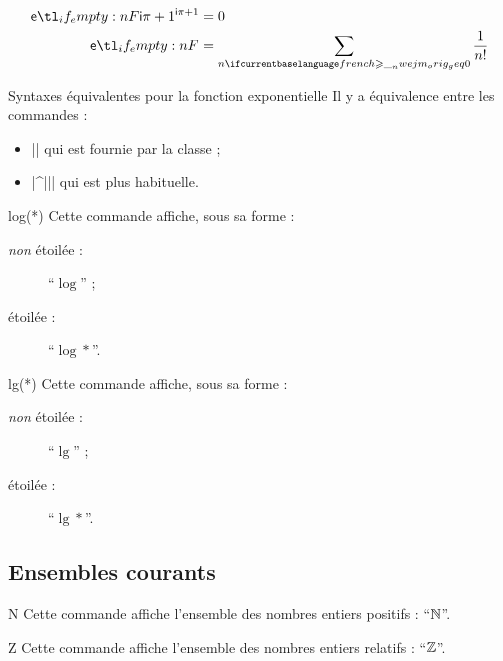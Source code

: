 \begin{bodycode}
\begin{align}
  \E[\I\pi+1] & = 0 \\
  \E          & = \sum_{n\geq 0} \frac{1}{n!}
\end{align}
\end{bodycode}

\begin{dbremark}{Syntaxes équivalentes pour la fonction exponentielle}{}
  Il y a équivalence entre les commandes :
  \begin{itemize}
  \item || qui est fournie par la classe ;
  \item |\E^{||}| qui est plus habituelle.
\end{itemize}
\end{dbremark}

\begin{docCommand}{log(*)}{}
  Cette commande affiche, sous sa forme :
  \begin{description}
  \item[\emph{non} étoilée :] \enquote{$\log$} ;
  \item[étoilée :] \enquote{$\log*$}.
  \end{description}
\end{docCommand}

\begin{docCommand}{lg(*)}{}
  Cette commande affiche, sous sa forme :
  \begin{description}
  \item[\emph{non} étoilée :] \enquote{$\lg$} ;
  \item[étoilée :] \enquote{$\lg*$}.
  \end{description}
\end{docCommand}

\subsection{Ensembles courants}

\begin{docCommand}{N}{}
  Cette commande affiche l'ensemble des nombres entiers positifs :
  \enquote{$\mathbb{N}$}.
\end{docCommand}

\begin{docCommand}{Z}{}
  Cette commande affiche l'ensemble des nombres entiers relatifs :
  \enquote{$\mathbb{Z}$}.
\end{docCommand}


